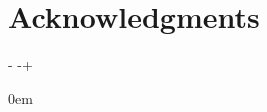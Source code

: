 \documentclass[letterpaper,             %
               oneside,                 %
               \pointsize]              %
               {memoir}
\newlength{\verticalpush}               %
\newcommand{\contentslistsetup}{%
  \changepage%
    {-\baselineskip}%
    {}%
    {}%
    {}%
    {}%
    {\verticalpush}%
    {}%
    {}%
    {-\verticalpush+\baselineskip}%
}
\begin{document}
\chapter*{Acknowledgments}              %

\iftoggle{usemicrotype}                 %
  {\microtypesetup{protrusion=false}}%
  {}
\clearpage                              %
\contentslistsetup                      %

\pagestyle{ASUtoc}
\tableofcontents*                       %
  {\setlength{\cftchapterindent}%
    {0em}%
  }

\clearpage



\end{document}
